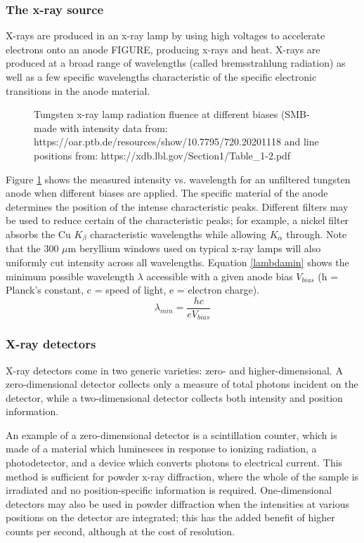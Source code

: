 \subsubsection{The x-ray source}
X-rays are produced in an x-ray lamp by using high voltages to accelerate electrons onto an anode FIGURE, producing x-rays and heat. X-rays are produced at a broad range of wavelengths (called bremsstrahlung radiation) as well as a few specific wavelengths characteristic of the specific electronic transitions in the anode material.
\begin{figure}[htbp]
  \centering
  
  \caption{Tungsten x-ray lamp radiation fluence at different biases (SMB-made with intensity data from: https://oar.ptb.de/resources/show/10.7795/720.20201118 and line positions from: https://xdb.lbl.gov/Section1/Table_1-2.pdf}
  \label{Wradiation}
\end{figure}
Figure \ref{Wradiation} shows the measured intensity vs. wavelength for an unfiltered tungsten anode when different biases are applied. The specific material of the anode determines the position of the intense characteristic peaks. Different filters may be used to reduce certain of the characteristic peaks; for example, a nickel filter absorbs the Cu $K_\beta$ characteristic wavelengths while allowing $K_\alpha$ through. Note that the 300 $\mu$m beryllium windows used on typical x-ray lamps will also uniformly cut intensity across all wavelengths. Equation \ref{lambdamin} shows the minimum possible wavelength $\lambda$ accessible with a given anode bias $V_{bias}$ (h = Planck’s constant, c = speed of light, e = electron charge). 
\begin{equation}
    \lambda_{min} = \frac{hc}{eV_{bias} }
    \label{lambdamin}
\end{equation}

\subsubsection{X-ray detectors}
X-ray detectors come in two generic varieties: zero- and higher-dimensional. A zero-dimensional detector collects only a measure of total photons incident on the detector, while a two-dimensional detector collects both intensity and position information.

An example of a zero-dimensional detector is a scintillation counter, which is made of a material which luminesces in response to ionizing radiation, a photodetector, and a device which converts photons to electrical current. This method is sufficient for powder x-ray diffraction, where the whole of the sample is irradiated and no position-specific information is required. One-dimensional detectors may also be used in powder diffraction when the intensities at various positions on the detector are integrated; this has the added benefit of higher counts per second, although at the cost of resolution.

